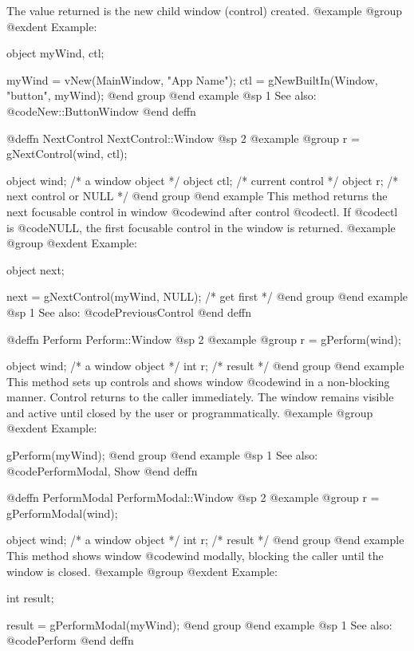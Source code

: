 The value returned is the new child window (control) created.
@example
@group
@exdent Example:

object  myWind, ctl;

myWind = vNew(MainWindow, "App Name");
ctl = gNewBuiltIn(Window, "button", myWind);
@end group
@end example
@sp 1
See also:  @code{New::ButtonWindow}
@end deffn












@deffn {NextControl} NextControl::Window
@sp 2
@example
@group
r = gNextControl(wind, ctl);

object  wind;   /*  a window object      */
object  ctl;    /*  current control      */
object  r;      /*  next control or NULL */
@end group
@end example
This method returns the next focusable control in window @code{wind}
after control @code{ctl}.  If @code{ctl} is @code{NULL}, the first
focusable control in the window is returned.
@example
@group
@exdent Example:

object  next;

next = gNextControl(myWind, NULL);  /* get first */
@end group
@end example
@sp 1
See also:  @code{PreviousControl}
@end deffn




@deffn {Perform} Perform::Window
@sp 2
@example
@group
r = gPerform(wind);

object  wind;   /*  a window object  */
int     r;      /*  result           */
@end group
@end example
This method sets up controls and shows window @code{wind} in a
non-blocking manner.  Control returns to the caller immediately.
The window remains visible and active until closed by the user or
programmatically.
@example
@group
@exdent Example:

gPerform(myWind);
@end group
@end example
@sp 1
See also:  @code{PerformModal, Show}
@end deffn




@deffn {PerformModal} PerformModal::Window
@sp 2
@example
@group
r = gPerformModal(wind);

object  wind;   /*  a window object  */
int     r;      /*  result           */
@end group
@end example
This method shows window @code{wind} modally, blocking the caller
until the window is closed.
@example
@group
@exdent Example:

int  result;

result = gPerformModal(myWind);
@end group
@end example
@sp 1
See also:  @code{Perform}
@end deffn




